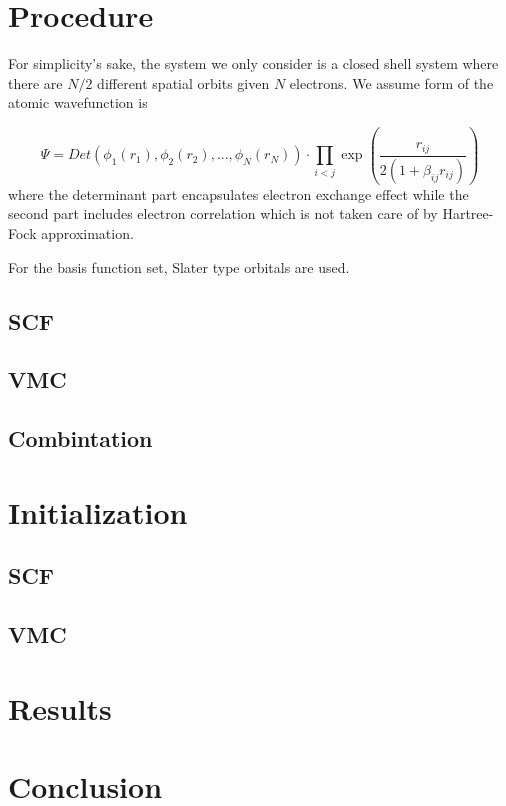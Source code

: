 \documentclass[11pt]{article}
\begin{document}
\section{Procedure}

For simplicity's sake, the system we only consider is a closed shell system where there are $N/2$ different spatial orbits given $N$ electrons. We assume form of the atomic wavefunction is 

\begin{equation}
\label{eq:atomic-wavefunction}
    \Psi = Det(\phi_1(r_1), \phi_2(r_2), ..., \phi_N(r_N)) \cdot \prod_{i<j}\exp(\frac{r_{ij}}{2(1 + \beta_{ij}r_{ij})})
\end{equation}
where the determinant part encapsulates electron exchange effect while the second part includes electron correlation which is not taken care of by Hartree-Fock approximation. 

For the basis function set, Slater type orbitals are used. 
\subsection{SCF}

\subsection{VMC}

\subsection{Combintation}


\section{Initialization}

\subsection{SCF}
\subsection{VMC}

\section{Results}

\section{Conclusion}

\printbibliography %
\end{document}
